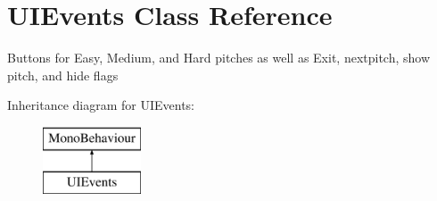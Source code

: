 \hypertarget{class_u_i_events}{}\section{U\+I\+Events Class Reference}
\label{class_u_i_events}


Buttons for Easy, Medium, and Hard pitches as well as Exit, nextpitch, show pitch, and hide flags  


Inheritance diagram for U\+I\+Events\+:\begin{figure}[H]
\begin{center}
\leavevmode
\includegraphics[height=2.000000cm]{class_u_i_events}
\end{center}
\end{figure}
